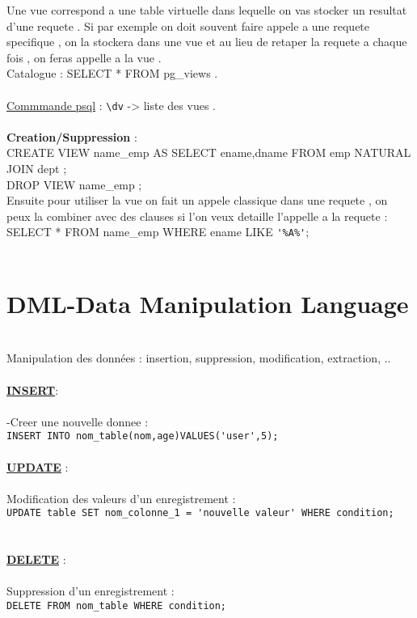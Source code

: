 \documentclass[a4paper,12pt,openany]{book}
\begin{document}
Une vue correspond a une table virtuelle dans lequelle on vas stocker un resultat d'une requete . Si par exemple on doit souvent faire appele a une requete specifique , on la stockera dans une vue et au lieu de retaper la requete a chaque fois , on feras appelle a la vue .\\
Catalogue : SELECT * FROM pg\_views .\\
\\
\underline{Commmande psql} : \verb+\dv+ -> liste des vues .\\
\\
\textbf{Creation/Suppression} : \\
CREATE VIEW name\_emp AS SELECT ename,dname FROM emp NATURAL JOIN dept ;\\
DROP VIEW name\_emp ;
\\
Ensuite pour utiliser la vue on fait un appele classique dans une requete , on peux la combiner avec des clauses si l'on veux detaille l'appelle a la requete : \\
SELECT * FROM name\_emp WHERE ename LIKE \verb+'%A%'+;\\
\\



\chapter{DML-Data Manipulation Language}
\\
Manipulation des données : insertion, suppression, modification, extraction, ..\\
\\
\underline{\textbf{INSERT}}:\\
\\
-Creer une nouvelle donnee :\\
\verb+INSERT INTO nom_table(nom,age)VALUES('user',5);+
\\
\\
\underline{\textbf{UPDATE}} :\\
\\
Modification des valeurs d'un enregistrement : \\
\verb+UPDATE table SET nom_colonne_1 = 'nouvelle valeur' WHERE condition;+\\
\\
\\
\underline{\textbf{DELETE}} :\\
\\
Suppression d'un enregistrement : \\
\verb+DELETE FROM nom_table WHERE condition;+\\
\\
\end{document}
